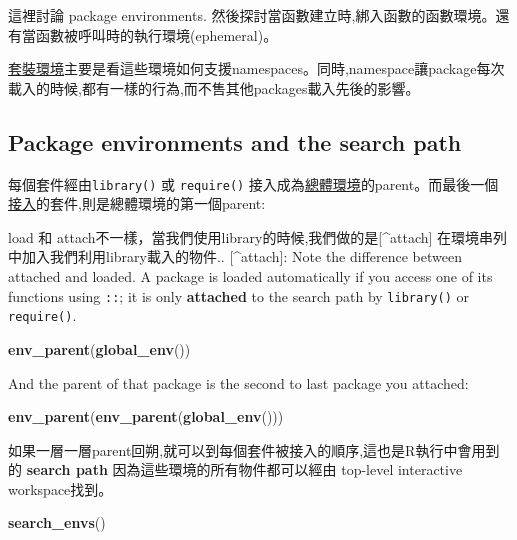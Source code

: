 \documentclass[]{book}
\newenvironment{Shaded}{\begin{snugshade}}{\end{snugshade}}
\newcommand{\KeywordTok}[1]{\textcolor[rgb]{0.13,0.29,0.53}{\textbf{#1}}}
\newcommand{\NormalTok}[1]{#1}
\theoremstyle{definition}
\theoremstyle{definition}
\theoremstyle{definition}
\theoremstyle{remark}
\begin{document}
這裡討論 package environments.
然後探討當函數建立時,綁入函數的函數環境。還有當函數被呼叫時的執行環境(ephemeral)。

\href{package-environments}{套裝環境}主要是看這些環境如何支援namespaces。同時,namespace讓package每次載入的時候,都有一樣的行為,而不售其他packages載入先後的影響。

\hypertarget{package-environments-and-the-search-path}{%
\subsection{Package environments and the search
path}\label{package-environments-and-the-search-path}}

每個套件經由\texttt{library()} 或 \texttt{require()}
接入成為\protect\hyperlink{global-environment}{總體環境}的parent。而最後一個\protect\hyperlink{attach}{接入}的套件,則是總體環境的第一個parent:

load 和 attach不一樣，當我們使用library的時候,我們做的是{[}\^{}attach{]}
在環境串列中加入我們利用library載入的物件.. {[}\^{}attach{]}: Note the
difference between attached and loaded. A package is loaded
automatically if you access one of its functions using \texttt{::}; it
is only \textbf{attached} to the search path by \texttt{library()} or
\texttt{require()}.

\begin{Shaded}
\begin{Highlighting}[]
\KeywordTok{env_parent}\NormalTok{(}\KeywordTok{global_env}\NormalTok{())}
\end{Highlighting}
\end{Shaded}

And the parent of that package is the second to last package you
attached:

\begin{Shaded}
\begin{Highlighting}[]
\KeywordTok{env_parent}\NormalTok{(}\KeywordTok{env_parent}\NormalTok{(}\KeywordTok{global_env}\NormalTok{()))}
\end{Highlighting}
\end{Shaded}

如果一層一層parent回朔,就可以到每個套件被接入的順序,這也是R執行中會用到的
\textbf{search path} 因為這些環境的所有物件都可以經由 top-level
interactive workspace找到。

\begin{Shaded}
\begin{Highlighting}[]
\KeywordTok{search_envs}\NormalTok{()}
\end{Highlighting}
\end{Shaded}
\end{document}
